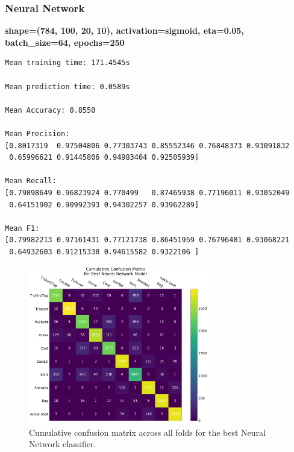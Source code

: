 \documentclass[11pt,a4paper]{article}
\begin{document}
\subsubsection*{Neural Network}
\textbf{shape=(784, 100, 20, 10), activation=sigmoid, eta=0.05, batch\_size=64, epochs=250}
\begin{verbatim}
Mean training time: 171.4545s

Mean prediction time: 0.0589s

Mean Accuracy: 0.8550

Mean Precision:
[0.8017319  0.97504806 0.77303743 0.85552346 0.76848373 0.93091832
 0.65996621 0.91445806 0.94983404 0.92505939]

Mean Recall:
[0.79898649 0.96823924 0.770499   0.87465938 0.77196011 0.93052049
 0.64151902 0.90992393 0.94302257 0.93962289]

Mean F1:
[0.79982213 0.97161431 0.77121738 0.86451959 0.76796481 0.93068221
 0.64932603 0.91215338 0.94615582 0.9322106 ]

\end{verbatim}
\begin{figure}[H]
    \centering
    \includegraphics[width=0.7\textwidth]{img/conf_mat_nn.png}
    \caption{Cumulative confusion matrix across all folds for the best Neural Network classifier.}
    \label{fig:conf_mat_nn}
\end{figure}
\end{document}
